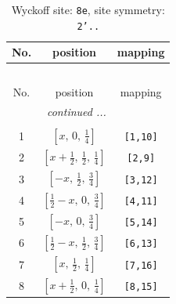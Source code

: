 \documentclass[fleqn,8pt]{jsarticle}
\begin{document}
\begin{longtable}{ccc}
\caption{Wyckoff site: {\tt 8e}, site symmetry: {\tt 2'..}}
 \\
 \hline \hline
No. & position & mapping \\ \hline \endfirsthead

\multicolumn{2}{l}{\tablename\ \thetable{}} \\
 \hline \hline
No. & position & mapping \\ \hline \endhead

 \hline \hline
\multicolumn{2}{r}{\footnotesize\it continued ...} \\ \endfoot

 \hline \hline
\multicolumn{2}{r}{} \\ \endlastfoot

1 & $\left[ x,\, 0,\, \frac{1}{4} \right]$ & {\tt [1,10]} \\ \hline
2 & $\left[ x + \frac{1}{2},\, \frac{1}{2},\, \frac{1}{4} \right]$ & {\tt [2,9]} \\ \hline
3 & $\left[ - x,\, \frac{1}{2},\, \frac{3}{4} \right]$ & {\tt [3,12]} \\ \hline
4 & $\left[ \frac{1}{2} - x,\, 0,\, \frac{3}{4} \right]$ & {\tt [4,11]} \\ \hline
5 & $\left[ - x,\, 0,\, \frac{3}{4} \right]$ & {\tt [5,14]} \\ \hline
6 & $\left[ \frac{1}{2} - x,\, \frac{1}{2},\, \frac{3}{4} \right]$ & {\tt [6,13]} \\ \hline
7 & $\left[ x,\, \frac{1}{2},\, \frac{1}{4} \right]$ & {\tt [7,16]} \\ \hline
8 & $\left[ x + \frac{1}{2},\, 0,\, \frac{1}{4} \right]$ & {\tt [8,15]} \\
\end{longtable}
\renewcommand{\arraystretch}{1.2}
\end{document}

